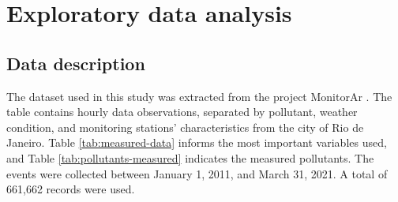 \section{Exploratory data analysis}
\label{sec:eda}

\subsection{Data description}

The dataset used in this study was extracted from the project MonitorAr
\cite{dataset-rio-ar-quality}. The table contains hourly data observations, separated by
pollutant, weather condition, and monitoring stations' characteristics from
the city of Rio de Janeiro. Table
\ref{tab:measured-data} informs the most important variables used, and Table
\ref{tab:pollutants-measured} indicates the measured pollutants. The events were collected between January 1,
2011,
and March 31, 2021. A total of 661,662 records were used. 

